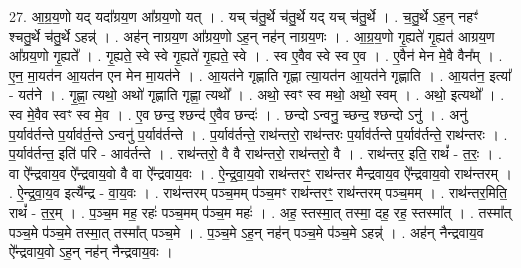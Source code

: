 \documentclass[17pt]{extarticle}
\begin{document}
27. आ॒ग्र॒य॒णो यद् यदा᳚ग्रय॒ण आ᳚ग्रय॒णो यत् । . यच् च॑तु॒र्थे च॑तु॒र्थे यद् यच् च॑तु॒र्थे । . च॒तु॒र्थे ऽह॒न् नहꣳ॑ श्चतु॒र्थे च॑तु॒र्थे ऽहन्न्॑ । . अह॑न् नाग्रय॒ण आ᳚ग्रय॒णो ऽह॒न् नह॑न् नाग्रय॒णः । . आ॒ग्र॒य॒णो गृ॒ह्यते॑ गृ॒ह्यत॑ आग्रय॒ण आ᳚ग्रय॒णो गृ॒ह्यते᳚ । . गृ॒ह्यते॒ स्वे स्वे गृ॒ह्यते॑ गृ॒ह्यते॒ स्वे । . स्व ए॒वैव स्वे स्व ए॒व । . ए॒वैन॑ मेन मे॒वै वैन᳚म् । . ए॒न॒ मा॒यत॑न आ॒यत॑न एन मेन मा॒यत॑ने । . आ॒यत॑ने गृह्णाति गृह्णा त्या॒यत॑न आ॒यत॑ने गृह्णाति । . आ॒यत॑न॒ इत्या᳚ - यत॑ने । . गृ॒ह्णा॒ त्यथो॒ अथो॑ गृह्णाति गृह्णा॒ त्यथो᳚ । . अथो॒ स्वꣳ स्व मथो॒ अथो॒ स्वम् । . अथो॒ इत्यथो᳚ । . स्व मे॒वैव स्वꣳ स्व मे॒व । . ए॒व छन्द॒ श्छन्द॑ ए॒वैव छन्दः॑ । . छन्दो ऽन्वनु॒ च्छन्द॒ श्छन्दो ऽनु॑ । . अनु॑ प॒र्याव॑र्तन्ते प॒र्याव॑र्त॒न्ते ऽन्वनु॑ प॒र्याव॑र्तन्ते । . प॒र्याव॑र्तन्ते॒ राथ॑न्तरो॒ राथ॑न्तरः प॒र्याव॑र्तन्ते प॒र्याव॑र्तन्ते॒ राथ॑न्तरः । . प॒र्याव॑र्तन्त॒ इति॑ परि - आव॑र्तन्ते । . राथ॑न्तरो॒ वै वै राथ॑न्तरो॒ राथ॑न्तरो॒ वै । . राथ॑न्तर॒ इति॒ राथं᳚ - त॒रः॒ । . वा ऐ᳚न्द्रवाय॒व ऐ᳚न्द्रवाय॒वो वै वा ऐ᳚न्द्रवाय॒वः । . ऐ॒न्द्र॒वा॒य॒वो राथ॑न्तरꣳ॒॒ राथ॑न्तर मैन्द्रवाय॒व ऐ᳚न्द्रवाय॒वो राथ॑न्तरम् । . ऐ॒न्द्र॒वा॒य॒व इत्यै᳚न्द्र - वा॒य॒वः । . राथ॑न्तरम् पञ्च॒मम् प॑ञ्च॒मꣳ राथ॑न्तरꣳ॒॒ राथ॑न्तरम् पञ्च॒मम् । . राथ॑न्तर॒मिति॒ राथं᳚ - त॒र॒म् । . प॒ञ्च॒म मह॒ रहः॑ पञ्च॒मम् प॑ञ्च॒म महः॑ । . अह॒ स्तस्मा॒त् तस्मा॒ दह॒ रह॒ स्तस्मा᳚त् । . तस्मा᳚त् पञ्च॒मे प॑ञ्च॒मे तस्मा॒त् तस्मा᳚त् पञ्च॒मे । . प॒ञ्च॒मे ऽह॒न् नह॑न् पञ्च॒मे प॑ञ्च॒मे ऽहन्न्॑ । . अह॑न् नैन्द्रवाय॒व ऐ᳚न्द्रवाय॒वो ऽह॒न् नह॑न् नैन्द्रवाय॒वः । \newline
\end{document}
